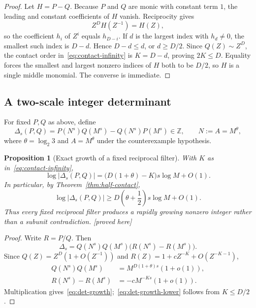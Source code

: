 \documentclass[11pt,oneside]{article}
\newtheorem{proposition}[theorem]{Proposition}
\theoremstyle{definition}
\theoremstyle{remark}
\newcommand{\Z}{\mathbb Z}
\newcommand{\proved}{\textcolor{deepgreen}{\textsf{[proved here]}}}
\begin{document}
\begin{proof}
Let $H=P-Q$.  Because $P$ and $Q$ are monic with constant term $1$, the leading and constant
coefficients of $H$ vanish.  Reciprocity gives
\[
 Z^DH(Z^{-1})=H(Z),
\]
so the coefficient $h_i$ of $Z^i$ equals $h_{D-i}$.  If $d$ is the largest index with
$h_d\ne0$, the smallest such index is $D-d$.  Hence $D-d\le d$, or $d\ge D/2$.
Since $Q(Z)\sim Z^D$, the contact order in~\eqref{eq:contact-infinity} is $K=D-d$, proving
$2K\le D$.  Equality forces the smallest and largest nonzero indices of $H$ both to be
$D/2$, so $H$ is a single middle monomial.  The converse is immediate.
\end{proof}

\subsection{A two-scale integer determinant}

For fixed $P,Q$ as above, define
\begin{equation}
 \Delta_s(P,Q)=P(N^s)Q(M^s)-Q(N^s)P(M^s)\in\Z,
 \qquad N:=A=M^\theta,
 \label{eq:two-scale-det}
\end{equation}
where $\theta=\log_2 3$ and $A=M^\theta$ under the counterexample hypothesis.

\begin{proposition}[Exact growth of a fixed reciprocal filter]
\label{prop:reciprocal-growth}
With $K$ as in~\eqref{eq:contact-infinity},
\begin{equation}
 \log|\Delta_s(P,Q)|
 =\bigl(D(1+\theta)-K\bigr)s\log M+O(1).
 \label{eq:det-growth}
\end{equation}
In particular, by Theorem~\ref{thm:half-contact},
\begin{equation}
 \log|\Delta_s(P,Q)|
 \ge D\left(\theta+\frac12\right)s\log M+O(1).
 \label{eq:det-growth-lower}
\end{equation}
Thus every fixed reciprocal filter produces a rapidly growing nonzero integer rather than a
subunit contradiction.  \proved
\end{proposition}

\begin{proof}
Write $R=P/Q$.  Then
\[
 \Delta_s=Q(N^s)Q(M^s)\bigl(R(N^s)-R(M^s)\bigr).
\]
Since $Q(Z)=Z^D(1+O(Z^{-1}))$ and
$R(Z)=1+cZ^{-K}+O(Z^{-K-1})$,
\begin{align*}
 Q(N^s)Q(M^s)&=M^{D(1+\theta)s}(1+o(1)),\\
 R(N^s)-R(M^s)&=-cM^{-Ks}(1+o(1)).
\end{align*}
Multiplication gives~\eqref{eq:det-growth};~\eqref{eq:det-growth-lower} follows from
$K\le D/2$.
\end{proof}
\end{document}
